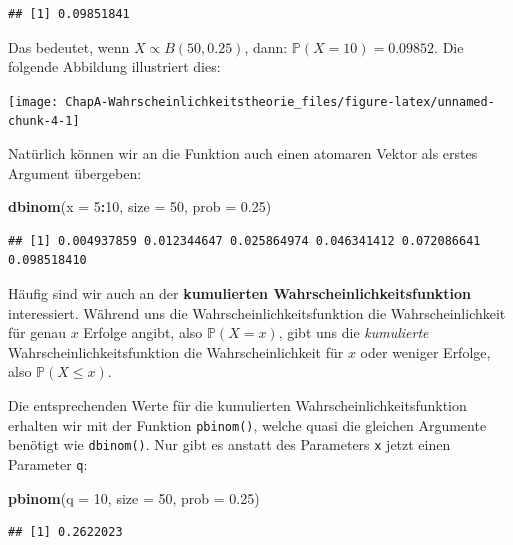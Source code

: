 \documentclass[]{book}
\newenvironment{Shaded}{\begin{snugshade}}{\end{snugshade}}
\newcommand{\KeywordTok}[1]{\textcolor[rgb]{0.13,0.29,0.53}{\textbf{#1}}}
\newcommand{\DataTypeTok}[1]{\textcolor[rgb]{0.13,0.29,0.53}{#1}}
\newcommand{\DecValTok}[1]{\textcolor[rgb]{0.00,0.00,0.81}{#1}}
\newcommand{\FloatTok}[1]{\textcolor[rgb]{0.00,0.00,0.81}{#1}}
\newcommand{\OperatorTok}[1]{\textcolor[rgb]{0.81,0.36,0.00}{\textbf{#1}}}
\newcommand{\NormalTok}[1]{#1}
\begin{document}
\begin{verbatim}
## [1] 0.09851841
\end{verbatim}

Das bedeutet, wenn \(X \propto B(50, 0.25)\), dann:
\(\mathbb{P}(X=10)=0.09852\). Die folgende Abbildung illustriert dies:

\begin{center}\texttt{[image: ChapA-Wahrscheinlichkeitstheorie\_files/figure-latex/unnamed-chunk-4-1]} \end{center}

Natürlich können wir an die Funktion auch einen atomaren Vektor als
erstes Argument übergeben:

\begin{Shaded}
\begin{Highlighting}[]
\KeywordTok{dbinom}\NormalTok{(}\DataTypeTok{x =} \DecValTok{5}\OperatorTok{:}\DecValTok{10}\NormalTok{, }\DataTypeTok{size =} \DecValTok{50}\NormalTok{, }\DataTypeTok{prob =} \FloatTok{0.25}\NormalTok{)}
\end{Highlighting}
\end{Shaded}

\begin{verbatim}
## [1] 0.004937859 0.012344647 0.025864974 0.046341412 0.072086641 0.098518410
\end{verbatim}

Häufig sind wir auch an der \textbf{kumulierten
Wahrscheinlichkeitsfunktion} interessiert. Während uns die
Wahrscheinlichkeitsfunktion die Wahrscheinlichkeit für genau \(x\)
Erfolge angibt, also \(\mathbb{P}(X=x)\), gibt uns die \emph{kumulierte}
Wahrscheinlichkeitsfunktion die Wahrscheinlichkeit für \(x\) oder
weniger Erfolge, also \(\mathbb{P}(X\leq x)\).

Die entsprechenden Werte für die kumulierten Wahrscheinlichkeitsfunktion
erhalten wir mit der Funktion \texttt{pbinom()}, welche quasi die
gleichen Argumente benötigt wie \texttt{dbinom()}. Nur gibt es anstatt
des Parameters \texttt{x} jetzt einen Parameter \texttt{q}:

\begin{Shaded}
\begin{Highlighting}[]
\KeywordTok{pbinom}\NormalTok{(}\DataTypeTok{q =} \DecValTok{10}\NormalTok{, }\DataTypeTok{size =} \DecValTok{50}\NormalTok{, }\DataTypeTok{prob =} \FloatTok{0.25}\NormalTok{)}
\end{Highlighting}
\end{Shaded}

\begin{verbatim}
## [1] 0.2622023
\end{verbatim}
\end{document}
